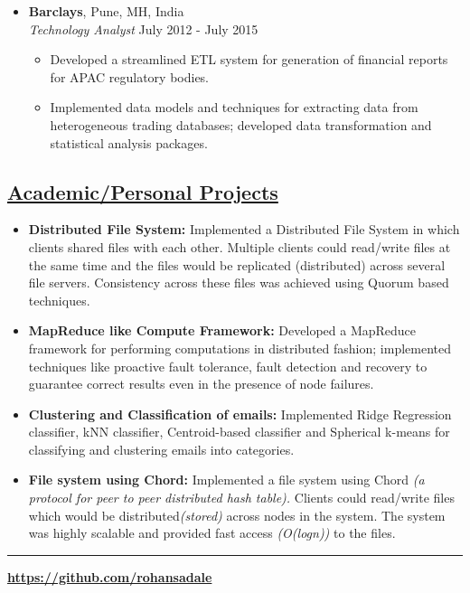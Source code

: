 \documentclass[10pt]{article}
\begin{document}
\begin{itemize}[leftmargin=0.15in]
\begin{itemize}
\end{itemize}

\item  {\bfseries Barclays}, Pune, MH, India \\
{\sl Technology Analyst} \hfill July 2012 - July 2015
\vspace{-0.15cm}
\begin{itemize}
\setlength{\itemsep}{0.2em}%
\item Developed a streamlined ETL system for generation of financial reports for APAC regulatory bodies.
\item Implemented data models and techniques for extracting data from heterogeneous trading databases; developed data transformation and statistical analysis packages.
\end{itemize}
\end{itemize}

\subsection*{\underline{Academic/Personal Projects}}
\vspace{-0.05cm}
\begin{itemize}[leftmargin=0.15in]

\item {\bfseries Distributed File System:} Implemented a Distributed File System in which clients shared files with each other. Multiple clients could read/write files at the same time and the files would be replicated (distributed) across several file servers. Consistency across these files was achieved using Quorum based techniques.

\item {\bfseries MapReduce like Compute Framework:} Developed a MapReduce framework for performing computations in distributed fashion; implemented techniques like proactive fault tolerance, fault detection and recovery to guarantee correct results even in the presence of node failures.

\item {\bfseries Clustering and Classification of emails:} Implemented Ridge Regression classifier, kNN classifier, Centroid-based classifier and Spherical k-means for classifying and clustering emails into categories.

\item {\bfseries File system using Chord:} Implemented a file system using Chord \textit{(a protocol for peer to peer distributed hash table).} Clients could read/write files which would be distributed\textit{(stored)} across nodes in the system. The system was highly scalable and provided fast access \textit{(O(logn))} to the files. 

\end{itemize}
\hrule
\noindent \begin{minipage}[b]{0.3\hsize}
\end{minipage}
\hfill
\begin{minipage}[b]{0.32 \hsize}
{\bfseries {\normalsize \url{https://github.com/rohansadale}}}
\end{minipage}
\end{document}
